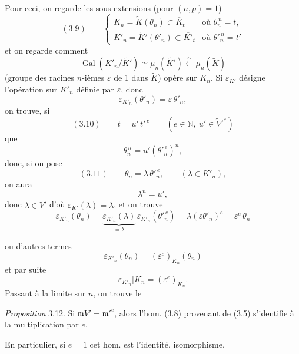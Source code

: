 \documentclass[11pt,a4paper]{article}
\begin{document}
Pour ceci, on regarde les sous-extensions (pour $(n,p) = 1$)
\[
  (3.9) \qquad
  \begin{cases}
    K_n = \widetilde{K}(\theta_n) \subset \overline{K}_t & \text{où } \theta_n^{\,n} = t , \\
    K'_n = \widetilde{K'}(\theta'_n) \subset \overline{K'}_t & \text{où } \theta'^{\,n}_n = t'
  \end{cases}
\]
et on regarde comment
\[
  \operatorname{Gal}(K'_n/\widetilde{K'}) \simeq \mu_n(\widetilde{K'}) \xleftarrow{\ \sim\ } \mu_n(\widetilde{K})
\]
(groupe des racines $n$-ièmes $\varepsilon$ de 1 dans $\widetilde{K}$) opère sur $K_n$. Si $\varepsilon_{K'}$ désigne l'opération sur $K'_n$ définie par $\varepsilon$, donc
\[
  \varepsilon_{K'_n}(\theta'_n) = \varepsilon\,\theta'_n ,
\]
on trouve, si
\[
  (3.10) \qquad t = u'\,t'^{\,e} \qquad (e \in \mathbb{N},\ u' \in \widetilde{V}'^{*})
\]
que
\[
  \theta_n^{\,n} = u' (\theta'^{\,e}_n)^{n} ,
\]
donc, si on pose
\[
  (3.11) \qquad \theta_n = \lambda\,\theta'^{\,e}_n , \qquad (\lambda \in K'_n) ,
\]
on aura
\[
  \lambda^n = u' ,
\]
donc \struck{\ill{}} $\lambda \in \widetilde{V}'$ \struck{\ill{}} d'où $\varepsilon_{K'}(\lambda) = \lambda$, et on trouve
\[
  \varepsilon_{K'_n}(\theta_n) = \underbrace{\varepsilon_{K'_n}(\lambda)}_{=\lambda}\, \varepsilon_{K'_n}(\theta'^{\,e}_n) = \lambda (\varepsilon\theta'_n)^{e} = \varepsilon^{e}\,\theta_n
\]

ou d'autres termes
\[
  \varepsilon_{K'_n}(\theta_n) = (\varepsilon^{e})_{K_n}(\theta_n)
\]
et par suite
\[
  \varepsilon_{K'_n} | K_n = (\varepsilon^{e})_{K_n} .
\]
Passant à la limite sur $n$, on trouve le

\emph{Proposition} 3.12. Si $\mathfrak{m}V' = \mathfrak{m}'^{e}$, alors l'hom.  (3.8) provenant de (3.5) s'identifie à la multiplication par $e$.

En particulier, si $e = 1$ cet hom. est l'identité, \struck{\ill{}}    isomorphisme. 
\end{document}
